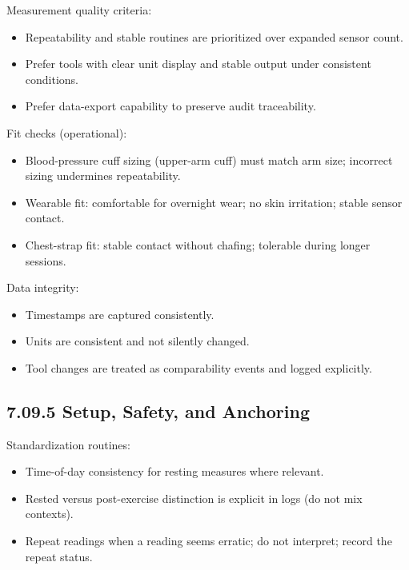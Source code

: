 \documentclass[10pt]{article}
\begin{document}
Measurement quality criteria:

\begin{itemize}
\item Repeatability and stable routines are prioritized over expanded sensor count.
\item Prefer tools with clear unit display and stable output under consistent conditions.
\item Prefer data-export capability to preserve audit traceability.
\end{itemize}

Fit checks (operational):

\begin{itemize}
\item Blood-pressure cuff sizing (upper-arm cuff) must match arm size; incorrect sizing undermines repeatability.
\item Wearable fit: comfortable for overnight wear; no skin irritation; stable sensor contact.
\item Chest-strap fit: stable contact without chafing; tolerable during longer sessions.
\end{itemize}

Data integrity:

\begin{itemize}
\item Timestamps are captured consistently.
\item Units are consistent and not silently changed.
\item Tool changes are treated as comparability events and logged explicitly.
\end{itemize}

\subsection*{7.09.5 Setup, Safety, and Anchoring}
{}

Standardization routines:

\begin{itemize}
\item Time-of-day consistency for resting measures where relevant.
\item Rested versus post-exercise distinction is explicit in logs (do not mix contexts).
\item Repeat readings when a reading seems erratic; do not interpret; record the repeat status.
\end{itemize}
\end{document}
